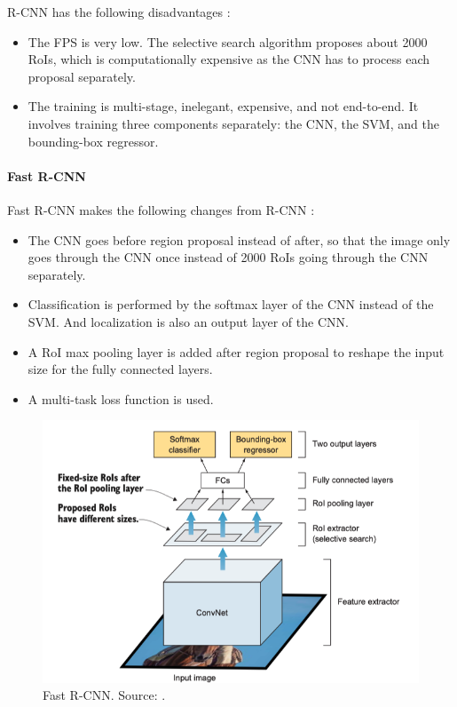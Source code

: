 \documentclass[a4paper, 11pt, oneside]{article}
\begin{document}
R-CNN has the following disadvantages \cite{elgendy2020deep, girshick2014rich, girshick2015fast}:

\begin{itemize}
  \item The FPS is very low. The selective search algorithm proposes about 2000 RoIs, which is computationally
  expensive as the CNN has to process each proposal separately.
  \item The training is multi-stage, inelegant, expensive, and not end-to-end. It involves training three components
  separately: the CNN, the SVM, and the bounding-box regressor.
\end{itemize}

\paragraph{Fast R-CNN}

Fast R-CNN makes the following changes from R-CNN \cite{elgendy2020deep, girshick2015fast}:

\begin{itemize}
  \item The CNN goes before region proposal instead of after, so that the image only goes through the CNN once instead
  of 2000 RoIs going through the CNN separately.
  \item Classification is performed by the softmax layer of the CNN instead of the SVM. And localization is also an output
  layer of the CNN.
  \item A RoI max pooling layer is added after region proposal to reshape the input size for the fully connected layers.
  \item A multi-task loss function is used.
\end{itemize}

\begin{figure}[ht]
  \begin{center}
    \includegraphics[width=.8\textwidth]{fast_r_cnn.png}
  \end{center}
  \caption{Fast R-CNN. Source: \cite{elgendy2020deep}.}
\end{figure}
\end{document}
